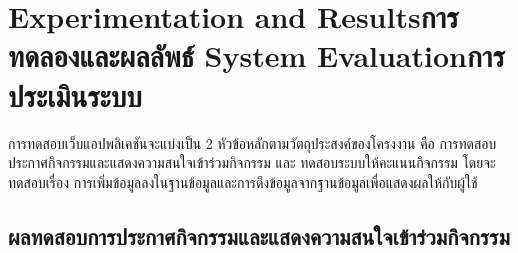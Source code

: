 \chapter{\ifproject%
\ifenglish Experimentation and Results\else การทดลองและผลลัพธ์\fi
\else%
\ifenglish System Evaluation\else การประเมินระบบ\fi
\fi}

การทดสอบเว็บแอปพลิเคชันจะแบ่งเป็น 2 หัวข้อหลักตามวัตถุประสงค์ของโครงงาน คือ การทดสอบประกาศกิจกรรมและแสดงความสนใจเข้าร่วมกิจกรรม และ ทดสอบระบบให้คะแนนกิจกรรม
โดยจะทดสอบเรื่อง การเพิ่มข้อมูลลงในฐานข้อมูลและการดึงข้อมูลจากฐานข้อมูลเพื่อแสดงผลให้กับผู้ใช้

\section{ผลทดสอบการประกาศกิจกรรมและแสดงความสนใจเข้าร่วมกิจกรรม}

